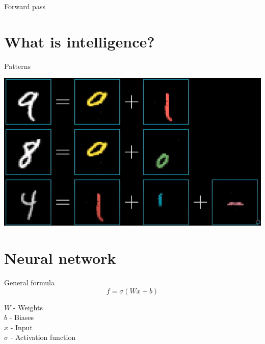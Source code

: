 \documentclass[aspectratio=169,xcolor=dvipsnames]{beamer}
\begin{document}
\begin{frame}{Forward pass}
    \begin{center}
    \end{center}
\end{frame}

\section{What is intelligence?}
\begin{frame}{Patterns}
    \begin{center}
        \includegraphics[width=\textheight]{../images/patterns.png}
    \end{center}
\end{frame}

\section{Neural network}
\begin{frame}{General formula}
    $$f = \sigma (Wx + b)$$
    \begin{center}
        $W$ - Weights \\
        $b$ - Biases  \\
        $x$ - Input \\
        $\sigma$ - Activation function            
    \end{center}
\end{frame}
\end{document}

